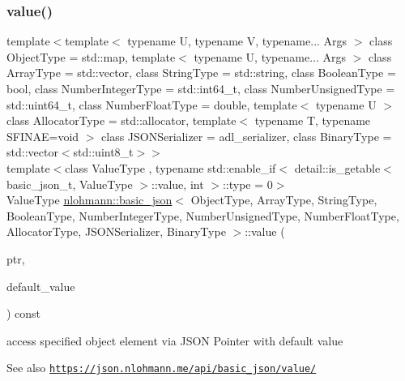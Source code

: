 \subsubsection{\texorpdfstring{value()}{value()}\hspace{0.1cm}{\footnotesize\ttfamily [3/4]}}
{\footnotesize\ttfamily template$<$template$<$ typename U, typename V, typename... Args $>$ class Object\+Type = std\+::map, template$<$ typename U, typename... Args $>$ class Array\+Type = std\+::vector, class String\+Type  = std\+::string, class Boolean\+Type  = bool, class Number\+Integer\+Type  = std\+::int64\+\_\+t, class Number\+Unsigned\+Type  = std\+::uint64\+\_\+t, class Number\+Float\+Type  = double, template$<$ typename U $>$ class Allocator\+Type = std\+::allocator, template$<$ typename T, typename S\+F\+I\+N\+A\+E=void $>$ class J\+S\+O\+N\+Serializer = adl\+\_\+serializer, class Binary\+Type  = std\+::vector$<$std\+::uint8\+\_\+t$>$$>$ \\
template$<$class Value\+Type , typename std\+::enable\+\_\+if$<$ detail\+::is\+\_\+getable$<$ basic\+\_\+json\+\_\+t, Value\+Type $>$\+::value, int $>$\+::type  = 0$>$ \\
Value\+Type \hyperlink{classnlohmann_1_1basic__json}{nlohmann\+::basic\+\_\+json}$<$ Object\+Type, Array\+Type, String\+Type, Boolean\+Type, Number\+Integer\+Type, Number\+Unsigned\+Type, Number\+Float\+Type, Allocator\+Type, J\+S\+O\+N\+Serializer, Binary\+Type $>$\+::value (\begin{DoxyParamCaption}\item[{const \hyperlink{classnlohmann_1_1basic__json_aa8f1f93b32da01b42413643be32b2c27}{json\+\_\+pointer} \&}]{ptr,  }\item[{const Value\+Type \&}]{default\+\_\+value }\end{DoxyParamCaption}) const\hspace{0.3cm}{\ttfamily [inline]}}



access specified object element via J\+S\+ON Pointer with default value 

\begin{DoxySeeAlso}{See also}
\href{https://json.nlohmann.me/api/basic_json/value/}{\tt https\+://json.\+nlohmann.\+me/api/basic\+\_\+json/value/} 
\end{DoxySeeAlso}
\mbox{\label{classnlohmann_1_1basic__json_a4658a584571c4180656f5268969ed0a1}} 
